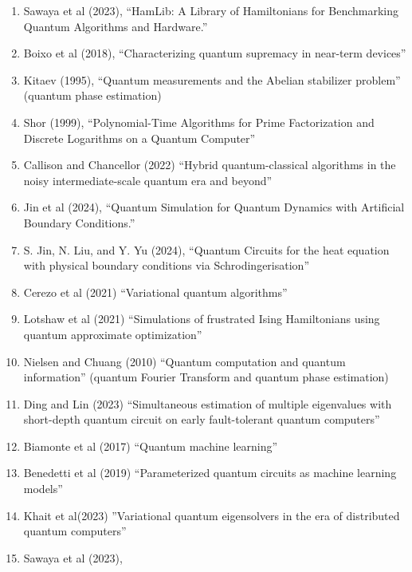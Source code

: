 \documentclass[]{article}
\begin{document}
\begin{enumerate}
\item Sawaya et al (2023)\cite{10313872}, ``HamLib: A Library of Hamiltonians for Benchmarking Quantum Algorithms and Hardware.''
\item Boixo et al (2018)\cite{boixo2018characterizing}, ``Characterizing quantum supremacy in near-term devices''
\item Kitaev (1995)\cite{kitaev1995quantum}, ``Quantum measurements and the Abelian stabilizer problem'' (quantum phase estimation)
\item Shor (1999)\cite{doi:10.1137/S0036144598347011}, ``Polynomial-Time Algorithms for Prime Factorization and Discrete Logarithms on a Quantum Computer''
\item Callison and Chancellor (2022)\cite{callison2022hybrid} ``Hybrid quantum-classical algorithms in the noisy intermediate-scale quantum era and beyond''
\item Jin et al (2024)\cite{doi:10.1137/23M1563451}, ``Quantum Simulation for Quantum Dynamics with Artificial Boundary Conditions.''
\item S. Jin, N. Liu, and Y. Yu (2024)\cite{jin2024quantum}, ``Quantum Circuits for the heat equation with physical boundary conditions via Schrodingerisation''
\item 
Cerezo et al (2021)\cite{cerezo2021variational} ``Variational quantum algorithms''
\item
Lotshaw et al (2021)\cite{doi:10.1098/rsta.2021.0414} ``Simulations of frustrated Ising Hamiltonians using quantum approximate optimization''
\item Nielsen and Chuang (2010)\cite{nielsen2010quantum}
``Quantum computation and quantum information'' (quantum Fourier Transform and
quantum phase estimation)
\item Ding and Lin (2023)\cite{ding2023simultaneous}
``Simultaneous estimation of multiple eigenvalues with short-depth quantum circuit on early fault-tolerant quantum computers''
\item Biamonte et al (2017)\cite{biamonte2017quantum}
``Quantum machine learning''
\item Benedetti et al (2019)\cite{Benedetti_2019}
``Parameterized quantum circuits as machine learning models''
\item Khait et al(2023)\cite{khait2023variational}
''Variational quantum eigensolvers in the era of distributed quantum computers''
\item Sawaya et al (2023)\cite{10313872},

\end{enumerate}
\end{document}
